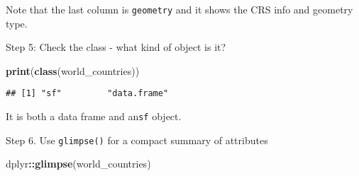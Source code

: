 \documentclass[
]{article}
\newenvironment{Shaded}{\begin{snugshade}}{\end{snugshade}}
\newcommand{\FunctionTok}[1]{\textcolor[rgb]{0.13,0.29,0.53}{\textbf{#1}}}
\newcommand{\NormalTok}[1]{#1}
\newcommand{\SpecialCharTok}[1]{\textcolor[rgb]{0.81,0.36,0.00}{\textbf{#1}}}
\begin{document}
Note that the last column is \texttt{geometry} and it shows the CRS info
and geometry type.

Step 5: Check the class - what kind of object is it?

\begin{Shaded}
\begin{Highlighting}[]
\FunctionTok{print}\NormalTok{(}\FunctionTok{class}\NormalTok{(world\_countries))}
\end{Highlighting}
\end{Shaded}

\begin{verbatim}
## [1] "sf"         "data.frame"
\end{verbatim}

It is both a data frame and an\texttt{sf} object.

Step 6. Use \texttt{glimpse()} for a compact summary of attributes

\begin{Shaded}
\begin{Highlighting}[]
\NormalTok{dplyr}\SpecialCharTok{::}\FunctionTok{glimpse}\NormalTok{(world\_countries)}
\end{Highlighting}
\end{Shaded}
\end{document}
